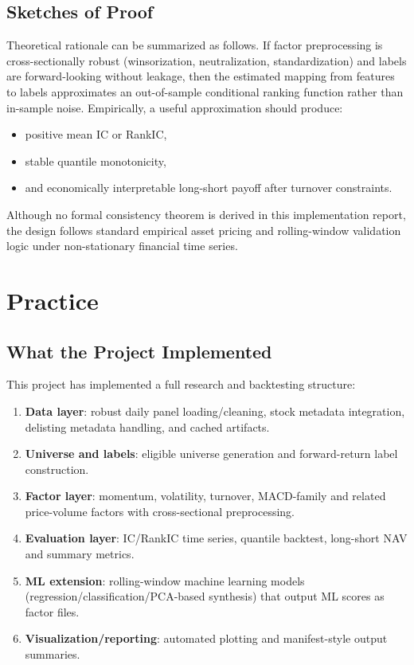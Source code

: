 \documentclass[letterpaper,11pt]{article}
\begin{document}
\subsection{Sketches of Proof}
Theoretical rationale can be summarized as follows. If factor preprocessing is cross-sectionally robust (winsorization, neutralization, standardization) and labels are forward-looking without leakage, then the estimated mapping from features to labels approximates an out-of-sample conditional ranking function rather than in-sample noise. Empirically, a useful approximation should produce:
\begin{itemize}
    \item positive mean IC or RankIC,
    \item stable quantile monotonicity,
    \item and economically interpretable long-short payoff after turnover constraints.
\end{itemize}

Although no formal consistency theorem is derived in this implementation report, the design follows standard empirical asset pricing and rolling-window validation logic under non-stationary financial time series.

\section{Practice}
\subsection{What the Project Implemented}
This project has implemented a full research and backtesting structure:
\begin{enumerate}
    \item \textbf{Data layer}: robust daily panel loading/cleaning, stock metadata integration, delisting metadata handling, and cached artifacts.
    \item \textbf{Universe and labels}: eligible universe generation and forward-return label construction.
    \item \textbf{Factor layer}: momentum, volatility, turnover, MACD-family and related price-volume factors with cross-sectional preprocessing.
    \item \textbf{Evaluation layer}: IC/RankIC time series, quantile backtest, long-short NAV and summary metrics.
    \item \textbf{ML extension}: rolling-window machine learning models (regression/classification/PCA-based synthesis) that output ML scores as factor files.
    \item \textbf{Visualization/reporting}: automated plotting and manifest-style output summaries.
\end{enumerate}
\end{document}
